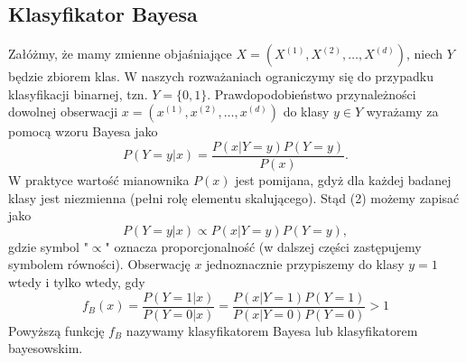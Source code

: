\documentclass[a4paper]{article}
\begin{document}
\subsection{Klasyfikator Bayesa}
Załóżmy, że mamy zmienne objaśniające $X = (X^{(1)}, X^{(2)},\dots,X^{(d)})$, niech $Y$ będzie zbiorem klas. W naszych rozważaniach ograniczymy się do przypadku klasyfikacji binarnej, tzn. $Y=\{0,1\}$. Prawdopodobieństwo przynależności dowolnej obserwacji $x=(x^{(1)},x^{(2)},\dots, x^{(d)})$ do klasy $y\in Y$ wyrażamy za pomocą wzoru Bayesa jako
\begin{equation}
    P(Y=y|x) = \frac{P(x|Y=y)P(Y=y)}{P(x)}.
\end{equation}
W praktyce wartość mianownika $P(x)$ jest pomijana, gdyż dla każdej badanej klasy jest niezmienna (pełni rolę elementu skalującego). Stąd (2) możemy zapisać jako
\begin{equation}
     P(Y=y|x) \propto P(x|Y=y)P(Y=y),
\end{equation}
gdzie symbol "$\propto$" oznacza proporcjonalność (w dalszej części zastępujemy symbolem równości). Obserwację $x$ jednoznacznie przypiszemy do klasy $y=1$ wtedy i tylko wtedy, gdy
\begin{equation}
    f_B(x) = \frac{P(Y=1|x)}{P(Y=0|x)} = \frac{P(x|Y=1)P(Y=1)}{P(x|Y=0)P(Y=0)} > 1
\end{equation}
Powyższą funkcję $f_B$ nazywamy klasyfikatorem Bayesa lub klasyfikatorem bayesowskim.
\end{document}
